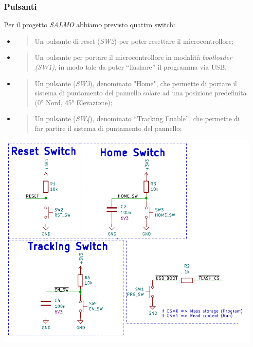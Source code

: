\hypertarget{pulsanti}{%
\subsubsection{\texorpdfstring{\hfill\break
Pulsanti}{ Pulsanti}}\label{pulsanti}}

Per il progetto \emph{SALMO} abbiamo previsto quattro switch:

\begin{itemize}
\item
  \begin{quote}
  Un pulsante di reset (\emph{SW2}) per poter resettare il
  microcontrollore;
  \end{quote}
\item
  \begin{quote}
  Un pulsante per portare il microcontrollore in modalità
  \emph{bootloader (SW1)}, in modo tale da poter ``flashare'' il
  programma via USB.
  \end{quote}
\item
  \begin{quote}
  Un pulsante (\emph{SW3}), denominato "Home", che permette di portare
  il sistema di puntamento del pannello solare ad una posizione
  predefinita (0° Nord, 45° Elevazione);
  \end{quote}
\item
  \begin{quote}
  Un pulsante (\emph{SW4}), denominato ``Tracking Enable'', che permette
  di far partire il sistema di puntamento del pannello;
  \end{quote}
\end{itemize}

\begin{center}
\includegraphics[scale=0.5]{figures/image16.png}
\captionsetup{type=figure}
\end{center}

